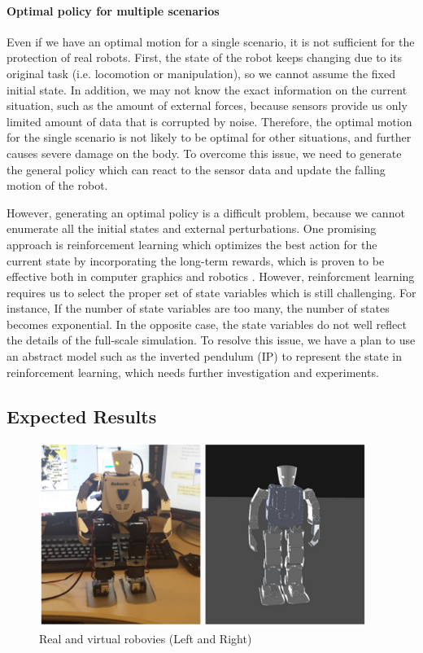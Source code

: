 \paragraph{Optimal policy for multiple scenarios}
Even if we have an optimal motion for a single scenario,
it is not sufficient for the protection of real robots.
First, the state of the robot keeps changing due to its original
task (i.e. locomotion or manipulation), so we cannot assume
the fixed initial state.
In addition, we may not know the exact information on the current
situation, such as the amount of external forces, because sensors
provide us only limited amount of data that is corrupted by noise.
Therefore, the optimal motion for the single scenario is not likely 
to be optimal for other situations, and further causes severe damage
on the body.
To overcome this issue, we need to generate the general policy which 
can react to the sensor data and update the falling motion of the robot.

However, generating an optimal policy is a difficult problem,
because we cannot enumerate all the initial states and external
perturbations.
One promising approach is reinforcement learning which optimizes
the best action for the current state by incorporating the long-term
rewards, which is proven to be effective both in computer graphics
\cite{Coros:2009:RTC} and robotics \cite{Morimoto:2004:SRL}.
However, reinforcment learning requires us to select the proper set
of state variables which is still challenging.
For instance, If the number of state variables are too many, 
the number of states becomes exponential.
In the opposite case, the state variables do not well reflect the 
details of the full-scale simulation.
To resolve this issue, we have a plan to use an abstract model such as the 
inverted pendulum (IP) to represent the state in reinforcement learning,
which needs further investigation and experiments.

\subsection{Expected Results}

\begin{figure}[htbp]
\center
  \includegraphics[width=4.2in]{images/falling2_robovies}
  \caption{Real and virtual robovies (Left and Right)} 
 \label{fig:robovies}
\end{figure}

